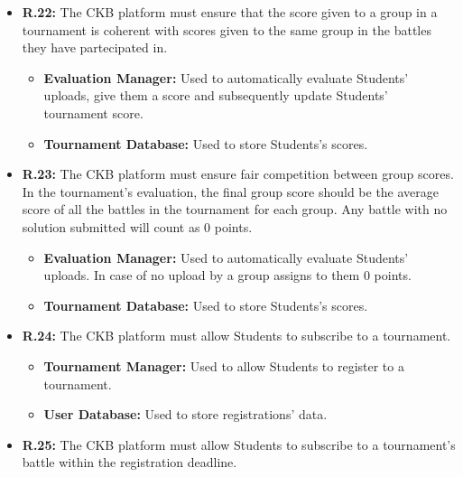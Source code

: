 \documentclass{article}
\begin{document}
{\begin{itemize}
\begin{itemize}
\begin{itemize}
              \item \textbf{Battle Manager:} Used to check if the submission phase of the battle has ended.
              \item \textbf{Tournament Manager:} Used to retrieve battle's data. 
          \end{itemize}
    \item \textbf{R.22:} The CKB platform must ensure that the score given to a group in a tournament is
          coherent with scores given to the same group in the battles they have partecipated in.
          \begin{itemize}
              \item \textbf{Evaluation Manager:} Used to automatically evaluate Students' uploads,
              give them a score and subsequently update Students' tournament score.
              \item \textbf{Tournament Database:} Used to store Students's scores.
          \end{itemize}
    \item \textbf{R.23:} The CKB platform must ensure fair competition between group scores. In the tournament's evaluation, the final
          group score should be the average score of all the battles in the tournament for each group. Any battle with no solution submitted will count
          as 0 points.
          \begin{itemize}
            \item \textbf{Evaluation Manager:} Used to automatically evaluate Students' uploads.
            In case of no upload by a group assigns to them 0 points.
            \item \textbf{Tournament Database:} Used to store Students's scores.
          \end{itemize}
    \item \textbf{R.24:} The CKB platform must allow Students to subscribe to a tournament.
          \begin{itemize}
              \item \textbf{Tournament Manager:} Used to allow Students to register to a tournament.
              \item \textbf{User Database:} Used to store registrations' data.
          \end{itemize}
    \item \textbf{R.25:} The CKB platform must allow Students to subscribe to a tournament's battle
          within the registration deadline.
          \begin{itemize}

\end{itemize}
\end{itemize}
\end{itemize}}
\end{document}
